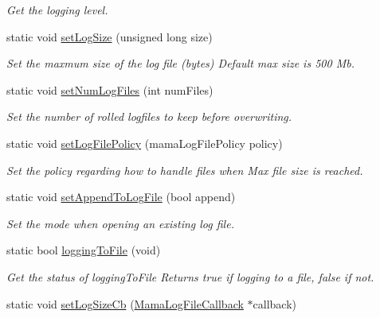 \begin{DoxyCompactItemize}
\begin{DoxyCompactList}\small\item\em Get the logging level. \item\end{DoxyCompactList}\item 
static void \hyperlink{classWombat_1_1Mama_abaa6a46829a05b403494a9ae51829fda}{setLogSize} (unsigned long size)
\begin{DoxyCompactList}\small\item\em Set the maxmum size of the log file (bytes) Default max size is 500 Mb. \item\end{DoxyCompactList}\item 
static void \hyperlink{classWombat_1_1Mama_a9455d10311f3c50fa3542309c72d8b42}{setNumLogFiles} (int numFiles)
\begin{DoxyCompactList}\small\item\em Set the number of rolled logfiles to keep before overwriting. \item\end{DoxyCompactList}\item 
static void \hyperlink{classWombat_1_1Mama_abc6645dce35582824c1aba9b914ec1c6}{setLogFilePolicy} (mamaLogFilePolicy policy)
\begin{DoxyCompactList}\small\item\em Set the policy regarding how to handle files when Max file size is reached. \item\end{DoxyCompactList}\item 
static void \hyperlink{classWombat_1_1Mama_af3a1c2d479262325d8111425f98c2b4e}{setAppendToLogFile} (bool append)
\begin{DoxyCompactList}\small\item\em Set the mode when opening an existing log file. \item\end{DoxyCompactList}\item 
static bool \hyperlink{classWombat_1_1Mama_a2bbe43b4c5dd0b748ee78521917072e2}{loggingToFile} (void)
\begin{DoxyCompactList}\small\item\em Get the status of loggingToFile Returns true if logging to a file, false if not. \item\end{DoxyCompactList}\item 
static void \hyperlink{classWombat_1_1Mama_af6d0cdfc8a039b09c5a6af9dda5acada}{setLogSizeCb} (\hyperlink{classWombat_1_1MamaLogFileCallback}{MamaLogFileCallback} $\ast$callback)

\end{DoxyCompactItemize}
